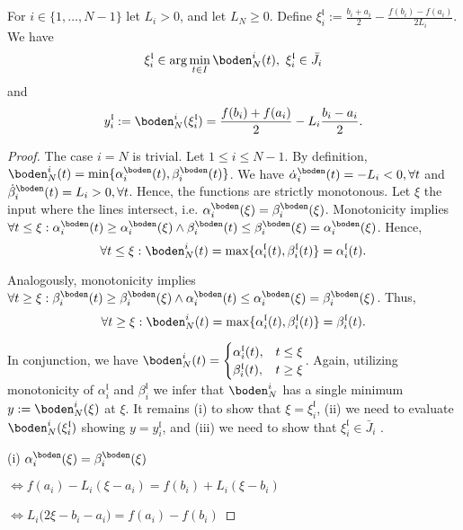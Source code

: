 \begin{lem} \label{lem:floor_values}
For $i \in \{1,\ldots,N-1\}$ let  $L_i > 0$, and let $L_N \geq 0$.
Define $\xi^{\mathfrak l}_i := \frac{b_i+a_i}{2} - \frac{f(b_i) - f(a_i)}{2 L_i}  $.\\
We have 
\[\xi^{\mathfrak l}_i \in \arg\min_{t \in I} \boden^i_N (t), \,\,\xi^{\mathfrak l}_i \in \bar J_i\]
and 
 \[y^{\mathfrak l}_i := \boden_N^i(\xi^{\mathfrak l}_i) = \frac{f(b_i) +f(a_i)}{2} - L_i \frac{b_i-a_i}{2} .\]
\begin{proof} The case $i = N$ is trivial. Let $1 \leq i \leq N-1$. By definition,
$\boden^i_N (t) = \min\{ \alpha^\boden_i(t), \beta^\boden_i(t)\}$.
We have $\dot  \alpha^\boden_i(t) = - L_i < 0, \forall t$ and $\dot  \beta^\boden_i(t) =  L_i > 0, \forall t$. Hence, the functions are strictly monotonous. Let $\xi$ the input where the lines intersect, i.e. $\alpha^\boden_i(\xi) = \beta^\boden_i(\xi)$. Monotonicity implies $\forall t \leq \xi : \alpha^\boden_i(t) \geq \alpha^\boden_i(\xi) \wedge \beta^\boden_i(t) \leq \beta^\boden_i(\xi) = \alpha^\boden_i(\xi)$. 
Hence,
 \[\forall t \leq \xi: \boden_N^i(t) = \max \{\alpha_i^{\mathfrak l} (t), \beta_i^{\mathfrak l} (t) \}= \alpha_i^{\mathfrak l} (t).\] 
 
Analogously, monotonicity implies $\forall t \geq \xi : \beta^\boden_i(t) \geq \beta^\boden_i(\xi) \wedge \alpha^\boden_i(t) \leq \alpha^\boden_i(\xi) = \beta^\boden_i(\xi)$. 
Thus,
 \[\forall t \geq \xi: \boden_N^i(t) = \max \{\alpha_i^{\mathfrak l} (t), \beta_i^{\mathfrak l} (t) \}= \beta_i^{\mathfrak l} (t).\] 

In conjunction, we have 
 $\boden_N^i(t) = 
 \begin{cases}  
 \alpha_i^{\mathfrak l} (t), & t \leq \xi \\
 \beta_i^{\mathfrak l} (t), & t \geq \xi 
 \end{cases}$.
 Again, utilizing monotonicity of $\alpha_i^{\mathfrak l}$ and $\beta_i^{\mathfrak l}$ we infer that $\boden_N^i$ has a single minimum $y := \boden_N^i(\xi)$ at $\xi$.
It remains  (i) to show that $\xi = \xi_i^{\mathfrak l}$, (ii) we need to evaluate $\boden_N^i(\xi^{\mathfrak l}_i)$ showing $y = y_i^{\mathfrak l}$, and (iii) we need to show that 
$\xi^{\mathfrak l}_i \in \bar J_i$ .

(i) $\alpha^\boden_i(\xi) = \beta^\boden_i(\xi)$

$\Leftrightarrow  f(a_i) - L_i (\xi - a_i) = f(b_i) +L_i (\xi - b_i)$

$\Leftrightarrow  L_i \bigl( 2 \xi - b_i  - a_i\bigr) = f(a_i) - f(b_i) $


\end{proof}
\end{lem}
